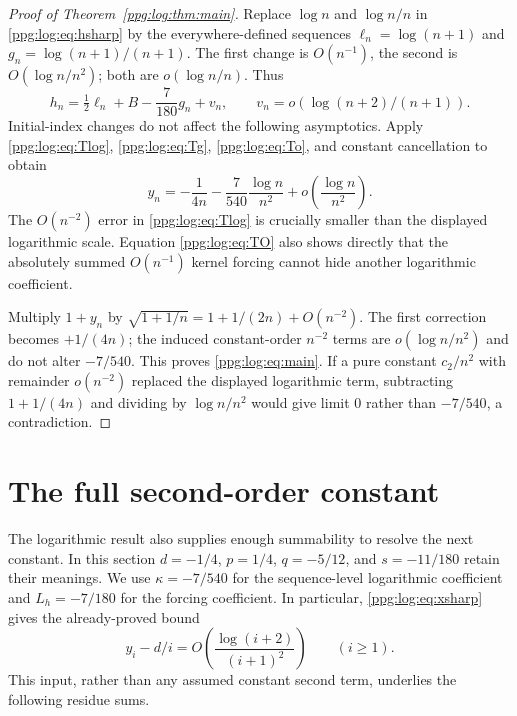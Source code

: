 \documentclass[11pt,letterpaper]{article}
\theoremstyle{remark}\newtheorem{remark}[theorem]{Remark}
\numberwithin{equation}{section}
\begin{document}
\begin{proof}[Proof of Theorem~\ref{ppg:log:thm:main}]
Replace $\log n$ and $\log n/n$ in \eqref{ppg:log:eq:hsharp} by the everywhere-defined sequences $\ell_n=\log(n+1)$ and $g_n=\log(n+1)/(n+1)$. The first change is $O(n^{-1})$, the second is $O(\log n/n^2)$; both are $o(\log n/n)$. Thus
\[
 h_n=\tfrac12\ell_n+B-\frac7{180}g_n+v_n,
 \qquad v_n=o(\log(n+2)/(n+1)).
\]
Initial-index changes do not affect the following asymptotics. Apply \eqref{ppg:log:eq:Tlog}, \eqref{ppg:log:eq:Tg}, \eqref{ppg:log:eq:To}, and constant cancellation to obtain
\begin{equation}\label{ppg:log:eq:xsharp}
 y_n=-\frac1{4n}-\frac7{540}\frac{\log n}{n^2}
                +o\!\left(\frac{\log n}{n^2}\right).
\end{equation}
The $O(n^{-2})$ error in \eqref{ppg:log:eq:Tlog} is crucially smaller than the displayed logarithmic scale. Equation \eqref{ppg:log:eq:TO} also shows directly that the absolutely summed $O(n^{-1})$ kernel forcing cannot hide another logarithmic coefficient.

Multiply $1+y_n$ by $\sqrt{1+1/n}=1+1/(2n)+O(n^{-2})$. The first correction becomes $+1/(4n)$; the induced constant-order $n^{-2}$ terms are $o(\log n/n^2)$ and do not alter $-7/540$. This proves \eqref{ppg:log:eq:main}. If a pure constant $c_2/n^2$ with remainder $o(n^{-2})$ replaced the displayed logarithmic term, subtracting $1+1/(4n)$ and dividing by $\log n/n^2$ would give limit 0 rather than $-7/540$, a contradiction.
\end{proof}

\section{The full second-order constant}\label{ppg:log:sec:constant}
The logarithmic result also supplies enough summability to resolve the next constant. In this section $d=-1/4$, $p=1/4$, $q=-5/12$, and $s=-11/180$ retain their meanings. We use $\kappa=-7/540$ for the sequence-level logarithmic coefficient and $L_h=-7/180$ for the forcing coefficient. In particular, \eqref{ppg:log:eq:xsharp} gives the already-proved bound
\begin{equation}\label{ppg:log:eq:residuebound}
 y_i-d/i=O\!\left(\frac{\log(i+2)}{(i+1)^2}\right)\qquad(i\ge1).
\end{equation}
This input, rather than any assumed constant second term, underlies the following residue sums.
\end{document}
